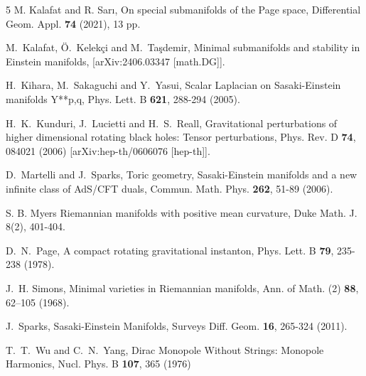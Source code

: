 \documentclass[11pt]{amsart}
\theoremstyle{plain}
\theoremstyle{definition}
\numberwithin{equation}{section}
\begin{document}
\begin{thebibliography}{5}
 M. Kalafat and R. Sar\i, On special submanifolds of the Page space, Differential Geom. Appl. {\bf 74} (2021), 13 pp.

M.~Kalafat, {\"O}.~Kelek{\c{c}}i and M.~Ta{\c{s}}demir,
Minimal submanifolds and stability in Einstein manifolds,
[arXiv:2406.03347 [math.DG]].

H.~Kihara, M.~Sakaguchi and Y.~Yasui, Scalar Laplacian on Sasaki-Einstein manifolds Y**p,q,
Phys. Lett. B \textbf{621}, 288-294 (2005).


H.~K.~Kunduri, J.~Lucietti and H.~S.~Reall,
Gravitational perturbations of higher dimensional rotating black holes: Tensor perturbations,
Phys. Rev. D \textbf{74}, 084021 (2006)
[arXiv:hep-th/0606076 [hep-th]].

D.~Martelli and J.~Sparks,
Toric geometry, Sasaki-Einstein manifolds and a new infinite class of AdS/CFT duals,
Commun. Math. Phys. \textbf{262}, 51-89 (2006). 

 S. B. Myers Riemannian manifolds with positive mean curvature, Duke Math. J. 8(2), 401-404.

D.~N.~Page, A compact rotating gravitational instanton,
Phys. Lett. B \textbf{79}, 235-238 (1978).

 J.~H. Simons, Minimal varieties in Riemannian manifolds, Ann. of Math. (2) {\bf 88},  62--105 (1968).

J.~Sparks, Sasaki-Einstein Manifolds,
Surveys Diff. Geom. \textbf{16}, 265-324 (2011).

T.~T.~Wu and C.~N.~Yang,
Dirac Monopole Without Strings: Monopole Harmonics,
Nucl. Phys. B \textbf{107}, 365 (1976)

\end{thebibliography}
\end{document}
